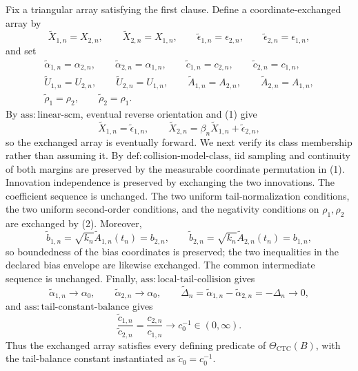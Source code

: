 Fix a triangular array satisfying the first clause. Define a coordinate-exchanged array by
\[
\widetilde X_{1,n}=X_{2,n},\qquad
\widetilde X_{2,n}=X_{1,n},\qquad
\widetilde\epsilon_{1,n}=\epsilon_{2,n},\qquad
\widetilde\epsilon_{2,n}=\epsilon_{1,n},
\tag{1}
\]
and set
\[
\begin{gathered}
\widetilde\alpha_{1,n}=\alpha_{2,n},\qquad
\widetilde\alpha_{2,n}=\alpha_{1,n},\qquad
\widetilde c_{1,n}=c_{2,n},\qquad
\widetilde c_{2,n}=c_{1,n},\\
\widetilde U_{1,n}=U_{2,n},\qquad
\widetilde U_{2,n}=U_{1,n},\qquad
\widetilde A_{1,n}=A_{2,n},\qquad
\widetilde A_{2,n}=A_{1,n},\\
\widetilde\rho_1=\rho_2,
\qquad
\widetilde\rho_2=\rho_1.
\end{gathered}
\tag{2}
\]
By \(\mathrm{ass{:}linear\text{-}scm}\), eventual reverse orientation and (1) give
\[
\widetilde X_{1,n}=\widetilde\epsilon_{1,n},
\qquad
\widetilde X_{2,n}=\beta_n\widetilde X_{1,n}+\widetilde\epsilon_{2,n},
\tag{3}
\]
so the exchanged array is eventually forward. We next verify its class membership rather than assuming it. By \(\mathrm{def{:}collision\text{-}model\text{-}class}\), iid sampling and continuity of both margins are preserved by the measurable coordinate permutation in (1). Innovation independence is preserved by exchanging the two innovations. The coefficient sequence is unchanged. The two uniform tail-normalization conditions, the two uniform second-order conditions, and the negativity conditions on \(\rho_1,\rho_2\) are exchanged by (2). Moreover,
\[
\widetilde b_{1,n}=\sqrt{k_n}\widetilde A_{1,n}(t_n)=b_{2,n},
\qquad
\widetilde b_{2,n}=\sqrt{k_n}\widetilde A_{2,n}(t_n)=b_{1,n},
\tag{4}
\]
so boundedness of the bias coordinates is preserved; the two inequalities in the declared bias envelope are likewise exchanged. The common intermediate sequence is unchanged. Finally, \(\mathrm{ass{:}local\text{-}tail\text{-}collision}\) gives
\[
\widetilde\alpha_{1,n}\longrightarrow\alpha_0,
\qquad
\widetilde\alpha_{2,n}\longrightarrow\alpha_0,
\qquad
\widetilde\Delta_n
=\widetilde\alpha_{1,n}-\widetilde\alpha_{2,n}
=-\Delta_n\longrightarrow0,
\tag{5}
\]
and \(\mathrm{ass{:}tail\text{-}constant\text{-}balance}\) gives
\[
\frac{\widetilde c_{1,n}}{\widetilde c_{2,n}}
=\frac{c_{2,n}}{c_{1,n}}
\longrightarrow c_0^{-1}\in(0,\infty).
\tag{6}
\]
Thus the exchanged array satisfies every defining predicate of \(\Theta_{\mathrm{CTC}}(B)\), with the tail-balance constant instantiated as \(\widetilde c_0=c_0^{-1}\).


